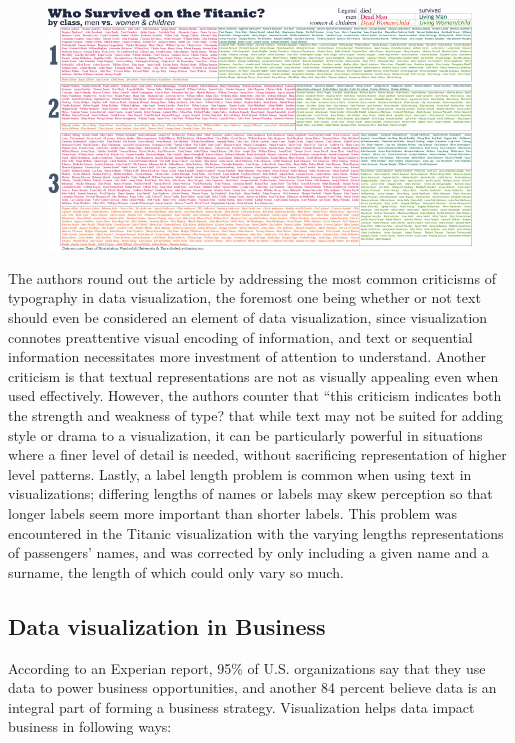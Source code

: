 \documentclass[]{book}
\theoremstyle{definition}
\theoremstyle{definition}
\theoremstyle{definition}
\theoremstyle{remark}
\begin{document}
\begin{figure}
\centering
\includegraphics{images/TypographicTitanic.jpg}
\caption{}
\end{figure}

The authors round out the article by addressing the most common
criticisms of typography in data visualization, the foremost one being
whether or not text should even be considered an element of data
visualization, since visualization connotes preattentive visual encoding
of information, and text or sequential information necessitates more
investment of attention to understand. Another criticism is that textual
representations are not as visually appealing even when used
effectively. However, the authors counter that ``this criticism
indicates both the strength and weakness of type? that while text may
not be suited for adding style or drama to a visualization, it can be
particularly powerful in situations where a finer level of detail is
needed, without sacrificing representation of higher level patterns.
Lastly, a label length problem is common when using text in
visualizations; differing lengths of names or labels may skew perception
so that longer labels seem more important than shorter labels. This
problem was encountered in the Titanic visualization with the varying
lengths representations of passengers' names, and was corrected by only
including a given name and a surname, the length of which could only
vary so much.

\subsection{Data visualization in
Business}\label{data-visualization-in-business}

\citep{biz_strategy} According to an Experian report, 95\% of U.S.
organizations say that they use data to power business opportunities,
and another 84 percent believe data is an integral part of forming a
business strategy. Visualization helps data impact business in following
ways:
\end{document}
